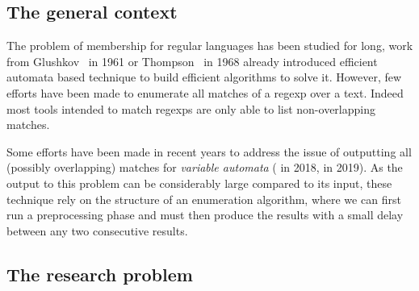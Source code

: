 \subsection*{The general context}


  The problem of membership for regular languages has been studied for long,
  work from Glushkov~\cite{glushkov1961abstract} in 1961 or
  Thompson~\cite{thompson1968programming} in 1968 already introduced efficient
  automata based technique to build efficient algorithms to solve it.
  However, few efforts have been made to enumerate all matches of a regexp over
  a text. Indeed most tools intended to match regexps are only able to list
  non-overlapping matches.

  Some efforts have been made in recent years to address the issue of
  outputting all (possibly overlapping) matches for \textit{variable automata}
  (\cite{florenzano2018constant} in 2018, \cite{ICDT19} in 2019). As the output
  to this problem can be considerably large compared to its input, these
  technique rely on the structure of an enumeration algorithm, where we can
  first run a preprocessing phase and must then produce the results with a
  small delay between any two consecutive results.


\subsection*{The research problem}



